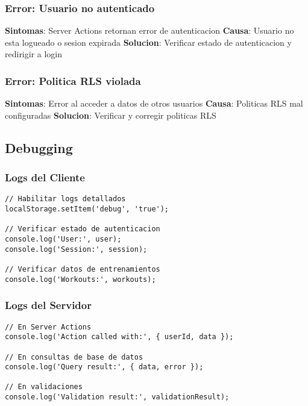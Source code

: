 \documentclass[12pt,a4paper]{article}
\begin{document}
\subsubsection{Error: Usuario no autenticado}

\textbf{Sintomas}: Server Actions retornan error de autenticacion
\textbf{Causa}: Usuario no esta logueado o sesion expirada
\textbf{Solucion}: Verificar estado de autenticacion y redirigir a login

\subsubsection{Error: Politica RLS violada}

\textbf{Sintomas}: Error al acceder a datos de otros usuarios
\textbf{Causa}: Politicas RLS mal configuradas
\textbf{Solucion}: Verificar y corregir politicas RLS

\subsection{Debugging}

\subsubsection{Logs del Cliente}

\begin{lstlisting}[caption=Debugging en cliente]
// Habilitar logs detallados
localStorage.setItem('debug', 'true');

// Verificar estado de autenticacion
console.log('User:', user);
console.log('Session:', session);

// Verificar datos de entrenamientos
console.log('Workouts:', workouts);
\end{lstlisting}

\subsubsection{Logs del Servidor}

\begin{lstlisting}[caption=Debugging en servidor]
// En Server Actions
console.log('Action called with:', { userId, data });

// En consultas de base de datos
console.log('Query result:', { data, error });

// En validaciones
console.log('Validation result:', validationResult);
\end{lstlisting}
\end{document}
